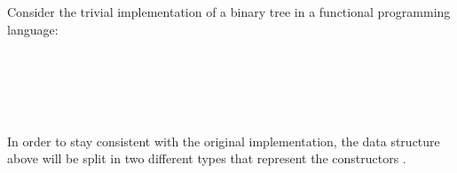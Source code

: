 \documentclass[12pt,twoside,notitlepage]{report}
\begin{document}
Consider the trivial implementation of a binary tree in a functional programming language:

\begin{code}
\\
\>[2]\<[4]%
\>[4]  \AgdaSymbol{(} \AgdaSymbol{:} \AgdaSymbol{)} \AgdaSymbol{:}  \<%
\\
\>[4]\<[6]%
\>[6] \AgdaSymbol{:}    \<%
\\
\>[4]\<[6]%
\>[6] \AgdaSymbol{:}        \<%
\\
\end{code}

In order to stay consistent with the original implementation, the data structure above will be split in two different types that represent the constructors \cite{numerical}.

\begin{code}
\\
\>[2]\<[4]%
\>[4]  \AgdaSymbol{(} \AgdaSymbol{:} \AgdaSymbol{)} \AgdaSymbol{:}  \<%
\\
\>[4]\<[6]%
\>[6] \AgdaSymbol{:}    \<%
\\
%
\\
\>[0]\<[4]%
\>[4]  \AgdaSymbol{(} \AgdaSymbol{:}   \AgdaSymbol{)(} \AgdaSymbol{:} \AgdaSymbol{)} \AgdaSymbol{:}  \<%
\\
\>[4]\<[6]%
\>[6] \AgdaSymbol{:} \AgdaSymbol{(} \AgdaSymbol{)}  \AgdaSymbol{(} \AgdaSymbol{)}    \<%
\\
\end{code}
\end{document}

